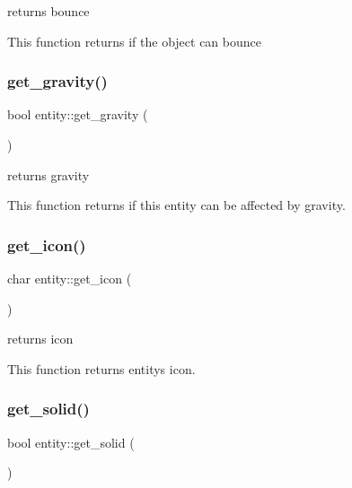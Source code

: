 returns bounce 

This function returns if the object can bounce \mbox{\label{classentity_a2e69aae60dda8b7a1b381f7e99f6913f}} 
\subsubsection{\texorpdfstring{get\+\_\+gravity()}{get\_gravity()}}
{\footnotesize\ttfamily bool entity\+::get\+\_\+gravity (\begin{DoxyParamCaption}{ }\end{DoxyParamCaption})\hspace{0.3cm}{\ttfamily [inline]}}



returns gravity 

This function returns if this entity can be affected by gravity. \mbox{\label{classentity_a7be4922bae8e57cb46947b752d6ee5b7}} 
\subsubsection{\texorpdfstring{get\+\_\+icon()}{get\_icon()}}
{\footnotesize\ttfamily char entity\+::get\+\_\+icon (\begin{DoxyParamCaption}{ }\end{DoxyParamCaption})\hspace{0.3cm}{\ttfamily [inline]}}



returns icon 

This function returns entity\textquotesingle{}s icon. \mbox{\label{classentity_a3831f4f3b9a07d9fa412909ba2e8d2e7}} 
\subsubsection{\texorpdfstring{get\+\_\+solid()}{get\_solid()}}
{\footnotesize\ttfamily bool entity\+::get\+\_\+solid (\begin{DoxyParamCaption}{ }\end{DoxyParamCaption})\hspace{0.3cm}{\ttfamily [inline]}}



